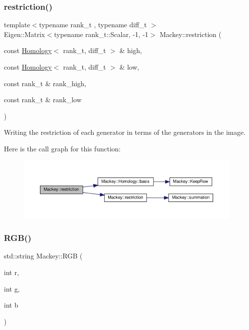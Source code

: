\subsubsection{\texorpdfstring{restriction()}{restriction()}\hspace{0.1cm}{\footnotesize\ttfamily [2/2]}}
{\footnotesize\ttfamily template$<$typename rank\+\_\+t , typename diff\+\_\+t $>$ \\
Eigen\+::\+Matrix$<$typename rank\+\_\+t\+::\+Scalar, -\/1, -\/1$>$ Mackey\+::restriction (\begin{DoxyParamCaption}\item[{const \hyperlink{classMackey_1_1Homology}{Homology}$<$ rank\+\_\+t, diff\+\_\+t $>$ \&}]{high,  }\item[{const \hyperlink{classMackey_1_1Homology}{Homology}$<$ rank\+\_\+t, diff\+\_\+t $>$ \&}]{low,  }\item[{const rank\+\_\+t \&}]{rank\+\_\+high,  }\item[{const rank\+\_\+t \&}]{rank\+\_\+low }\end{DoxyParamCaption})}



Writing the restriction of each generator in terms of the generators in the image. 

Here is the call graph for this function\+:\nopagebreak
\begin{figure}[H]
\begin{center}
\leavevmode
\includegraphics[width=350pt]{namespaceMackey_a256b1e73e413a924ce2bf0e86551a928_cgraph}
\end{center}
\end{figure}
\mbox{\label{namespaceMackey_a12645e850e7965ee23d47e00ac7affdf}} 
\subsubsection{\texorpdfstring{R\+G\+B()}{RGB()}}
{\footnotesize\ttfamily std\+::string Mackey\+::\+R\+GB (\begin{DoxyParamCaption}\item[{int}]{r,  }\item[{int}]{g,  }\item[{int}]{b }\end{DoxyParamCaption})}

